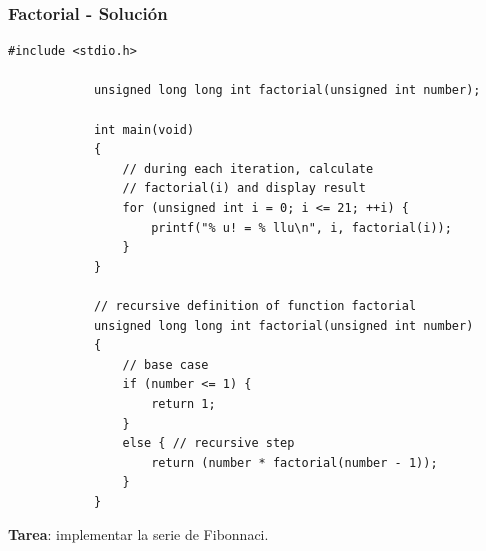 \documentclass[10.5pt,scale=1.0,t,aspectratio=169,hyperref={pdfpagelabels=false}]{beamer}
\begin{document}
\begin{frame}[fragile]
	\frametitle{Factorial - Soluci\'on}
		\begin{lstlisting}[style=CStyle]
			#include <stdio.h>
			
			unsigned long long int factorial(unsigned int number);
			
			int main(void)
			{
				// during each iteration, calculate
				// factorial(i) and display result
				for (unsigned int i = 0; i <= 21; ++i) {
					printf("% u! = % llu\n", i, factorial(i));
				}
			}
			
			// recursive definition of function factorial
			unsigned long long int factorial(unsigned int number)
			{
				// base case
				if (number <= 1) {
					return 1;
				}
				else { // recursive step
					return (number * factorial(number - 1));
				}
			}
		\end{lstlisting}
	\textbf{Tarea}: implementar la serie de Fibonnaci.
\end{frame}
\end{document}

